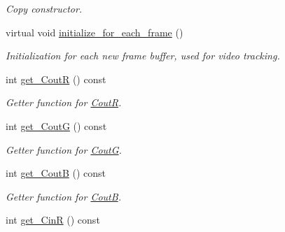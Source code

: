 \begin{DoxyCompactItemize}
\begin{DoxyCompactList}\small\item\em Copy constructor. \end{DoxyCompactList}\item 
\hypertarget{classofeli_1_1_a_cwithout_edges_y_u_v_ad24ef70875e3435c524cb1385c3c43d3}{virtual void \hyperlink{classofeli_1_1_a_cwithout_edges_y_u_v_ad24ef70875e3435c524cb1385c3c43d3}{initialize\-\_\-for\-\_\-each\-\_\-frame} ()}\label{classofeli_1_1_a_cwithout_edges_y_u_v_ad24ef70875e3435c524cb1385c3c43d3}

\begin{DoxyCompactList}\small\item\em Initialization for each new frame buffer, used for video tracking. \end{DoxyCompactList}\item 
\hypertarget{classofeli_1_1_a_cwithout_edges_y_u_v_a27259e0b651cc835fd9eb0285ee0f2f3}{int \hyperlink{classofeli_1_1_a_cwithout_edges_y_u_v_a27259e0b651cc835fd9eb0285ee0f2f3}{get\-\_\-\-Cout\-R} () const }\label{classofeli_1_1_a_cwithout_edges_y_u_v_a27259e0b651cc835fd9eb0285ee0f2f3}

\begin{DoxyCompactList}\small\item\em Getter function for \hyperlink{classofeli_1_1_a_cwithout_edges_y_u_v_a6d5f27cda390c51891165958613a0e19}{Cout\-R}. \end{DoxyCompactList}\item 
\hypertarget{classofeli_1_1_a_cwithout_edges_y_u_v_a4b501d61dfea61cb63ef5799d75215fd}{int \hyperlink{classofeli_1_1_a_cwithout_edges_y_u_v_a4b501d61dfea61cb63ef5799d75215fd}{get\-\_\-\-Cout\-G} () const }\label{classofeli_1_1_a_cwithout_edges_y_u_v_a4b501d61dfea61cb63ef5799d75215fd}

\begin{DoxyCompactList}\small\item\em Getter function for \hyperlink{classofeli_1_1_a_cwithout_edges_y_u_v_a7204eb013515fad29ae5248219803225}{Cout\-G}. \end{DoxyCompactList}\item 
\hypertarget{classofeli_1_1_a_cwithout_edges_y_u_v_ae2abe7f7808159770231689922fbad88}{int \hyperlink{classofeli_1_1_a_cwithout_edges_y_u_v_ae2abe7f7808159770231689922fbad88}{get\-\_\-\-Cout\-B} () const }\label{classofeli_1_1_a_cwithout_edges_y_u_v_ae2abe7f7808159770231689922fbad88}

\begin{DoxyCompactList}\small\item\em Getter function for \hyperlink{classofeli_1_1_a_cwithout_edges_y_u_v_a74c6d6e79c6360ff67fa6402b44ddfc8}{Cout\-B}. \end{DoxyCompactList}\item 
\hypertarget{classofeli_1_1_a_cwithout_edges_y_u_v_a6059683b3761306d4155f11e39cfb6bd}{int \hyperlink{classofeli_1_1_a_cwithout_edges_y_u_v_a6059683b3761306d4155f11e39cfb6bd}{get\-\_\-\-Cin\-R} () const }\label{classofeli_1_1_a_cwithout_edges_y_u_v_a6059683b3761306d4155f11e39cfb6bd}


\end{DoxyCompactItemize}
